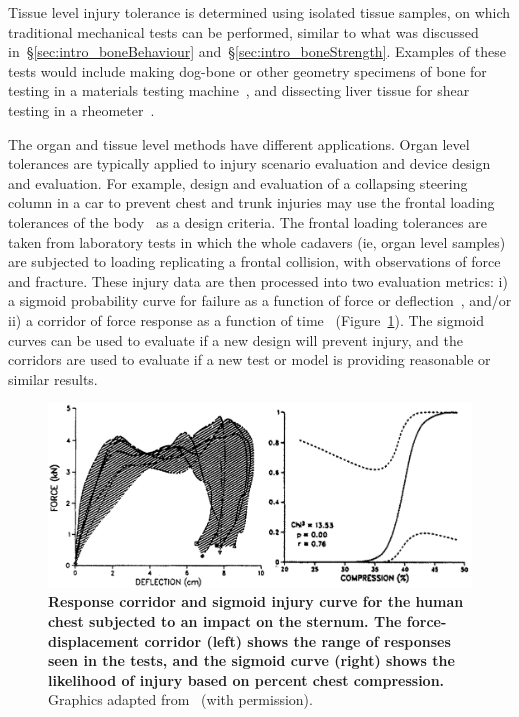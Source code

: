 Tissue level injury tolerance is determined using isolated tissue samples, on which traditional mechanical tests can be performed, similar to what was discussed in~\S\ref{sec:intro_boneBehaviour} and~\S\ref{sec:intro_boneStrength}.
Examples of these tests would include making dog-bone or other geometry specimens of bone for testing in a materials testing machine~\citep{zioupos_microcracking_2008}, and dissecting liver tissue for shear testing in a rheometer~\citep{liu_large_2002}.

The organ and tissue level methods have different applications.
Organ level tolerances are typically applied to injury scenario evaluation and device design and evaluation.
For example, design and evaluation of a collapsing steering column in a car to prevent chest and trunk injuries may use the frontal loading tolerances of the body~\citep{viano_biomechanics_1989} as a design criteria.
The frontal loading tolerances are taken from laboratory tests in which the whole cadavers (\ac{ie}, organ level samples) are subjected to loading replicating a frontal collision, with observations of force and fracture.
These injury data are then processed into two evaluation metrics: i) a sigmoid probability curve for failure as a function of force or deflection~\citep{viano_biomechanics_1989, beason_bone_2003}, and/or ii) a corridor of force response as a function of time~\citep{viano_biomechanics_1989} (Figure~\ref{fig:corridors_sigmoid}).
The sigmoid curves can be used to evaluate if a new design will prevent injury, and the corridors are used to evaluate if a new test or model is providing reasonable or similar results.

\begin{figure}
\centering
\includegraphics[width=\linewidth]{./intro/Figures/Viano_corridors_sigmoid}
\caption[Response corridors and injury curves]{\textbf{Response corridor and sigmoid injury curve for the human chest subjected to an impact on the sternum. The force-displacement corridor (left) shows the range of responses seen in the tests, and the sigmoid curve (right) shows the likelihood of injury based on percent chest compression.} Graphics adapted from~\citet{viano_biomechanics_1989} (with permission).}
\label{fig:corridors_sigmoid}
\end{figure}

